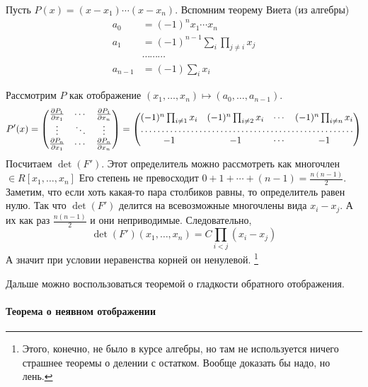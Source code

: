 \documentclass[12pt,trimbord]{../../../notes}
\begin{document}
\begin{ittproof}
  Пусть $P(x) = (x - x_1) \dotsm (x - x_n)$. Вспомним теорему Виета (из алгебры)
  \begin{align*}
    a_0     & = (-1)^n x_1 \dotsm x_n \\
    a_1     & = (-1)^{n-1} \sum_{i} \prod_{j \neq i} x_j \\
            & \cdots \cdots \cdots  \\
    a_{n-1} & = (-1) \sum_i x_i
  \end{align*}

  Рассмотрим $P$ как отображение $(x_1, \dotsc, x_n) \mapsto (a_0, \dotsc, a_{n-1})$.
  \[
    P'(x) = 
    \begin{pmatrix}
      \frac{\partial P_1}{\partial x_1} & \cdots & \frac{\partial P_1}{\partial x_n} \\
      \vdots & \ddots & \vdots \\
      \frac{\partial P_n}{\partial x_1} & \cdots & \frac{\partial P_n}{\partial x_n} \\
    \end{pmatrix}
    = 
    \begin{pmatrix}
      (-1)^n \prod_{i\neq 1} x_i & (-1)^n \prod_{i\neq 2} x_i & \cdots & (-1)^n \prod_{i\neq n} x_i \\
      \hdotsfor{4} \\
      -1 & -1 & \cdots & -1 
    \end{pmatrix}
  \]
  Посчитаем $\det(F')$. Этот определитель можно рассмотреть как многочлен $\in R[x_1, \dotsc, x_n]$
  Его степень не превосходит $0 + 1 + \dotsb + (n-1) = \frac{n(n-1)}{2}$. Заметим, что если хоть
  какая-то пара столбиков равны, то определитель равен нулю. Так что $\det(F')$ делится на
  всевозможные многочлены вида $x_i - x_j$. А их как раз $\frac{n(n-1)}{2}$ и они неприводимые.
  Следовательно, 
  \[
    \det (F')(x_1, \dotsc, x_n) = C \prod_{i<j} (x_i - x_j) 
  \]
  А значит при условии неравенства корней он ненулевой.
  \footnote{Этого, конечно, не было в курсе алгебры, но там не используется ничего страшнее
  теоремы о делении с остатком. Вообще доказать бы надо, но лень.}

  Дальше можно воспользоваться теоремой о гладкости обратного отображения.
\end{ittproof}

\paragraph{Теорема о неявном отображении}
\label{par:diffspace::implicit}
\end{document}
